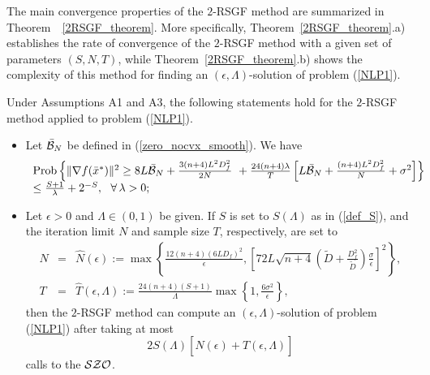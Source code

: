 \documentclass[final]{siamltex}
\newcommand{\beq}{\begin{equation}}
\newcommand{\eeq}{\end{equation}}
\newcommand{\beqa}{\begin{eqnarray}}
\newcommand{\eeqa}{\end{eqnarray}}
\def\eqnok#1{(\ref{#1})}
\def\vgap{\vspace*{.1in}}
\def\prob{{\rm Prob}}
\def\prob{\mathop{\rm Prob}}
\def\SZO{{\cal SZO}}
\def\cB{{\cal B}}
\begin{document}
\vgap

The main convergence properties of the
$2$-RSGF method are summarized in Theorem~~\ref{2RSGF_theorem}. More specifically, Theorem~\ref{2RSGF_theorem}.a)
establishes the rate of convergence of the $2$-RSGF method with
a given set of parameters $(S,N,T)$, while
Theorem~\ref{2RSGF_theorem}.b) shows the complexity of this method
for finding an $(\epsilon,\Lambda)$-solution
of problem \eqnok{NLP1}.


\begin{theorem} \label{2RSGF_theorem}
Under Assumptions A1 and A3, the following statements hold for the $2$-RSGF method
applied to problem \eqnok{NLP1}.
\begin{itemize}
\item [a)] Let $\bar{\cB}_N$ be defined in \eqnok{zero_nocvx_smooth}. We have
\beq \label{2RSGF_conv1}
\begin{array}{l}
\prob\left\{
\|\nabla f(\bar x^*)\|^2  \ge 8 L \bar{\cB}_N + \frac{3(n+4) L^2 D_f^2}{2 N}
 \,\,+ \frac{24(n+4)\lambda}{T}
\left[L \bar{\cB}_N + \frac{(n+4) L^2 D_f^2}{N} + \sigma^2\right]
\right\} \\
\le \frac{S+1}{\lambda} + 2^{-S}, \ \
\forall \, \lambda > 0;
\end{array}
\eeq
\item [b)] Let $\epsilon > 0$ and $\Lambda \in (0,1)$ be given.
If $S$ is set to $S(\Lambda)$ as in \eqnok{def_S}, and
 the iteration limit $N$ and sample size $T$, respectively, are set to
\beqa
N &=& \hat N(\epsilon) := \max \left\{ \frac{12(n+4) (6 L D_f)^2}{\epsilon},
\left[72 L \sqrt{n+4} \left(\tilde D + \frac{D_f^2}{\tilde D}\right)
\frac{\sigma}{\epsilon} \right]^2 \right\}, \label{zero_def_N} \\
T &=& \hat {T}(\epsilon,\Lambda):= \frac{24 (n+4) (S+1)}{\Lambda} \max \left\{1 ,  \frac{6 \sigma^2}{ \epsilon} \right\},
\label{def_That}
\eeqa
then the $2$-RSGF method can compute an $(\epsilon, \Lambda)$-solution of problem \eqnok{NLP1}
after taking at most
\beq \label{zero_bnd_compl}
2 S(\Lambda) \left[ \hat N(\epsilon) + \hat T(\epsilon, \Lambda)\right]
\eeq
calls to the $\SZO$.
\end{itemize}
\end{theorem}

\vgap
\end{document}
